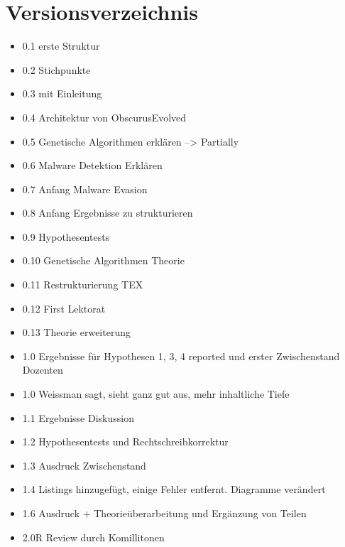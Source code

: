 \chapter{Versionsverzeichnis}
\begin{itemize}
    \item  0.1 erste Struktur
    \item 0.2 Stichpunkte
    \item 0.3 mit Einleitung
    \item 0.4 Architektur von ObscurusEvolved
    \item 0.5 Genetische Algorithmen erklären --> Partially
    \item 0.6 Malware Detektion Erklären
    \item 0.7 Anfang Malware Evasion
    \item 0.8 Anfang Ergebnisse zu strukturieren
    \item 0.9 Hypothesentests
    \item 0.10 Genetische Algorithmen Theorie
    \item 0.11 Restrukturierung TEX
    \item 0.12 First Lektorat
    \item 0.13 Theorie erweiterung
    \item 1.0 Ergebnisse für Hypothesen 1, 3, 4 reported und erster Zwischenstand Dozenten
    \item 1.0 Weissman sagt, sieht ganz gut aus, mehr inhaltliche Tiefe
    \item 1.1 Ergebnisse Diskussion
    \item 1.2 Hypothesentests und Rechtschreibkorrektur
    \item 1.3 Ausdruck Zwischenstand
    \item 1.4 Listings hinzugefügt, einige Fehler entfernt. Diagramme verändert
    \item 1.6 Ausdruck + Theorieüberarbeitung und Ergänzung von Teilen
    \item 2.0R Review durch Komillitonen
\end{itemize}
